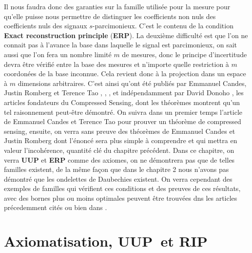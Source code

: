 Il nous faudra donc des garanties sur la famille utilisée pour la mesure pour qu'elle puisse nous permettre de distinguer les coefficients non nuls des coefficients nuls des signaux $s$-parcimonieux.
C'est le contenu de la condition \textbf{Exact reconstruction principle} (\textbf{ERP}).
\newline
La deuxième difficulté est que l'on ne connait pas à l'avance la base dans laquelle le signal est parcimonieux, on sait aussi que l'on fera un nombre limité $m$ de mesures, donc le principe d'incertitude devra être vérifié entre la base des mesures et n'importe quelle restriction à $m$ coordonées de la base inconnue.
Cela revient donc à la projection dans un espace à $m$ dimensions arbitraires.
C'est ainsi qu'ont été publiés par Emmanuel Candes, Justin Romberg et Terence Tao \cite{CR}, \cite{CT}, \cite{CRT}, et indépendamment par David Donoho \cite{DonohoCS}, les articles fondateurs du Compressed Sensing, dont les théorèmes montrent qu'un tel raisonnement peut-être démontré. 
\newline
On suivra dans un premier temps l'article de Emmanuel Candes et Terence Tao pour prouver un théorème de compressed sensing, ensuite, on verra sans preuve des théorèmes de Emmanuel Candes et Justin Romberg dont l'énoncé sera plus simple à comprendre et qui mettra en valeur l'incohérence, quantité clé du chapitre précédent.
Dans ce chapitre, on verra \textbf{UUP} et \textbf{ERP} comme des axiomes, on ne démontrera pas que de telles familles existent, de la même façon que dans le chapitre 2 nous n'avons pas démontré que les ondelettes de Daubechies existent.
On verra cependant des exemples de familles qui vérifient ces conditions et des preuves de ces résultats, avec des bornes plus ou moins optimales peuvent être trouvées dns les articles précedemment cités ou bien dans \cite{foucartbook}. 
\section{Axiomatisation, \textbf{UUP} et \textbf{RIP}}
